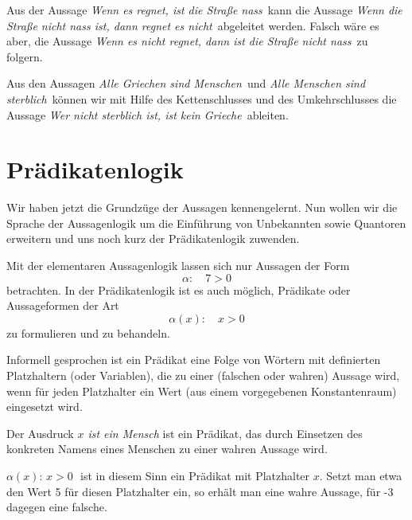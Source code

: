 \begin{beispiel}
Aus der Aussage 
\textit{Wenn es regnet, ist die Straße nass\,} kann die Aussage \textit{Wenn die Straße nicht nass ist, 
dann regnet es nicht\,} abgeleitet werden. Falsch wäre es aber, die Aussage \textit{Wenn es nicht regnet, 
dann ist die Straße nicht nass\,} zu folgern. 
\end{beispiel}

\begin{beispiel} Aus den Aussagen \textit{Alle Griechen sind Menschen\,} und \textit{Alle Menschen sind 
sterblich\,} können wir mit Hilfe des Kettenschlusses und des Umkehrschlusses die Aussage \textit{Wer 
nicht sterblich ist, ist kein Grieche\,} ableiten. 
\end{beispiel}

\section{Prädikatenlogik}

Wir haben jetzt die Grundzüge der Aussagen kennengelernt. Nun wollen wir die Sprache der Aussagenlogik um die 
Einführung von Unbekannten sowie Quantoren erweitern und uns noch kurz der Prädikatenlogik zuwenden. 

\medskip

Mit der elementaren Aussagenlogik lassen sich nur Aussagen der Form 
	$$ \alpha : \quad 7 > 0 $$ 
betrachten. In der Prädikatenlogik ist es auch möglich, Prädikate oder Aussageformen der Art 
	$$ \alpha(x) : \quad x > 0 $$ 
zu formulieren und zu behandeln. 

Informell gesprochen ist ein Prädikat eine Folge von Wörtern mit definierten Platzhaltern (oder Variablen), 
die zu einer (falschen oder wahren) Aussage wird, wenn für jeden Platzhalter ein Wert (aus einem 
vorgegebenen Konstantenraum) eingesetzt wird.


\begin{beispiel} Der Ausdruck \textit{$x$ ist ein Mensch} ist ein Prädikat, das durch Einsetzen des konkreten 
Namens eines Menschen zu einer wahren Aussage wird.
\end{beispiel}


\begin{beispiel}\label{praed_ein} $\alpha(x) : \, x > 0 \,\,$ ist in diesem Sinn ein Prädikat mit Platzhalter $x$. 
Setzt man etwa den Wert 5 für diesen Platzhalter ein, so erhält man eine wahre Aussage, für -3 dagegen eine falsche.
\end{beispiel}


